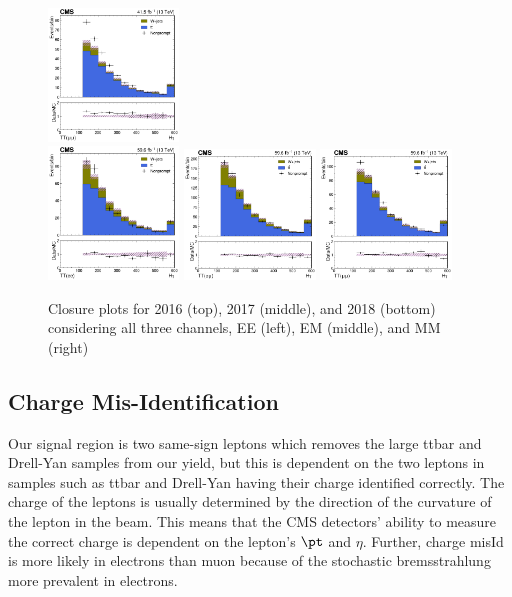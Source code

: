 \begin{figure}
  \includegraphics[width=0.31\textwidth]{closure/2017/ht_TT_MM.png} \\
  \includegraphics[width=0.31\textwidth]{closure/2018/ht_TT_EE.png} \hfill
  \includegraphics[width=0.31\textwidth]{closure/2018/ht_TT_EM.png} \hfill
  \includegraphics[width=0.31\textwidth]{closure/2018/ht_TT_MM.png} \\
  \caption{Closure plots for 2016 (top), 2017 (middle), and 2018 (bottom) considering all three channels, EE (left), EM (middle), and MM (right)}\label{fig:a}
\end{figure}


\subsection{Charge Mis-Identification}\label{sec:charge_misId}
Our signal region is two same-sign leptons which removes the large ttbar and Drell-Yan samples from our yield, but this is dependent on the two leptons in samples such as ttbar and Drell-Yan having their charge identified correctly. The charge of the leptons is usually determined by the direction of the curvature of the lepton in the beam. This means that the CMS detectors' ability to measure the correct charge is dependent on the lepton's $\pt$ and $\eta$. Further, charge misId is more likely in electrons than muon because of the stochastic bremsstrahlung more prevalent in electrons.

